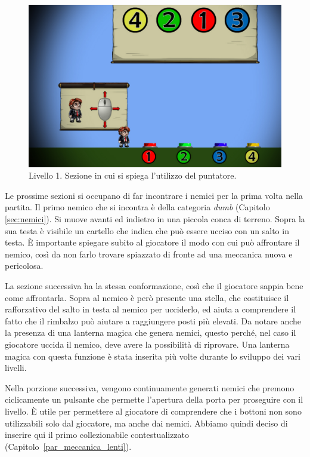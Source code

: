 \begin{figure}%
	\centering
	\includegraphics[width= 0.75\columnwidth]{images/gameDesign/45_mouse.jpg}
	\caption{Livello 1. Sezione in cui si spiega l'utilizzo del puntatore.}
	\label{fig:livello1_puntatore}
\end{figure}

Le prossime sezioni si occupano di far incontrare i nemici per la prima volta nella partita. Il primo nemico che si incontra è della categoria \textit{dumb} (Capitolo \ref{sec:nemici}). Si muove avanti ed indietro in una piccola conca di terreno. Sopra la sua testa è visibile un cartello che indica che può essere ucciso con un salto in testa. È importante spiegare subito al giocatore il modo con cui può affrontare il nemico, così da non farlo trovare spiazzato di fronte ad una meccanica nuova e pericolosa.

La sezione successiva ha la stessa conformazione, così che il giocatore sappia bene come affrontarla. Sopra al nemico è però presente una stella, che costituisce il rafforzativo del salto in testa al nemico per ucciderlo, ed aiuta a comprendere il fatto che il rimbalzo può aiutare a raggiungere posti più elevati. Da notare anche la presenza di una lanterna magica che genera nemici, questo perché, nel caso il giocatore uccida il nemico, deve avere la possibilità di riprovare. Una lanterna magica con questa funzione è stata inserita più volte durante lo sviluppo dei vari livelli.

Nella porzione successiva, vengono continuamente generati nemici che premono ciclicamente un pulsante che permette l’apertura della porta per proseguire con il livello. È utile per permettere al giocatore di comprendere che i bottoni non sono utilizzabili solo dal giocatore, ma anche dai nemici.
Abbiamo quindi deciso di inserire qui il primo collezionabile contestualizzato (Capitolo~\ref{par_meccanica_lenti}). 

